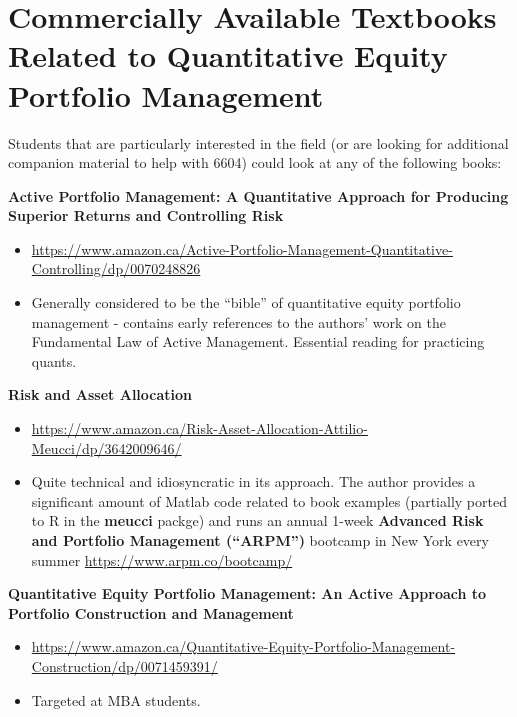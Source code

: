 \documentclass[]{book}
\providecommand{\tightlist}{%
  \setlength{\itemsep}{0pt}\setlength{\parskip}{0pt}}
\theoremstyle{definition}
\theoremstyle{definition}
\theoremstyle{definition}
\theoremstyle{remark}
\begin{document}
\section{Commercially Available Textbooks Related to Quantitative Equity
Portfolio
Management}\label{commercially-available-textbooks-related-to-quantitative-equity-portfolio-management}

Students that are particularly interested in the field (or are looking
for additional companion material to help with 6604) could look at any
of the following books:

\textbf{Active Portfolio Management: A Quantitative Approach for
Producing Superior Returns and Controlling Risk} \citep{grinold2000}

\begin{itemize}
\tightlist
\item
  \url{https://www.amazon.ca/Active-Portfolio-Management-Quantitative-Controlling/dp/0070248826}
\item
  Generally considered to be the ``bible'' of quantitative equity
  portfolio management - contains early references to the authors' work
  on the Fundamental Law of Active Management. Essential reading for
  practicing quants.
\end{itemize}

\textbf{Risk and Asset Allocation} \citep{meucci2005}

\begin{itemize}
\tightlist
\item
  \url{https://www.amazon.ca/Risk-Asset-Allocation-Attilio-Meucci/dp/3642009646/}
\item
  Quite technical and idiosyncratic in its approach. The author provides
  a significant amount of Matlab code related to book examples
  (partially ported to R in the \textbf{meucci} packge) and runs an
  annual 1-week \textbf{Advanced Risk and Portfolio Management
  (``ARPM'')} bootcamp in New York every summer
  \url{https://www.arpm.co/bootcamp/}
\end{itemize}

\textbf{Quantitative Equity Portfolio Management: An Active Approach to
Portfolio Construction and Management} \citep{chincarini2006}

\begin{itemize}
\tightlist
\item
  \url{https://www.amazon.ca/Quantitative-Equity-Portfolio-Management-Construction/dp/0071459391/}
\item
  Targeted at MBA students.
\end{itemize}
\end{document}
